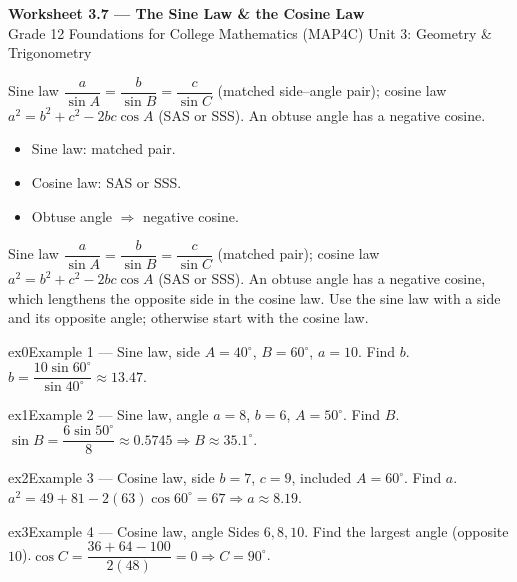 \documentclass[11pt]{article}
\begin{document}
\begin{center}
{\LARGE\bfseries\color{titleblue}Worksheet 3.7 --- The Sine Law \& the Cosine Law}\\[2pt]
{\small Grade 12 Foundations for College Mathematics (MAP4C) \textperiodcentered{} Unit 3: Geometry \& Trigonometry}
\end{center}

\begin{ideabox}
Sine law $\dfrac{a}{\sin A}=\dfrac{b}{\sin B}=\dfrac{c}{\sin C}$ (matched side–angle pair); cosine law $a^2=b^2+c^2-2bc\cos A$ (SAS or SSS). An obtuse angle has a negative cosine.
\begin{itemize}[leftmargin=*,itemsep=2pt]
  \item Sine law: matched pair.
  \item Cosine law: SAS or SSS.
  \item Obtuse angle $\Rightarrow$ negative cosine.
\end{itemize}
\end{ideabox}

\begin{learnbox}
Sine law $\dfrac{a}{\sin A}=\dfrac{b}{\sin B}=\dfrac{c}{\sin C}$ (matched pair); cosine law $a^2=b^2+c^2-2bc\cos A$ (SAS or SSS).
An obtuse angle has a negative cosine, which lengthens the opposite side in the cosine law.
Use the sine law with a side and its opposite angle; otherwise start with the cosine law.
\end{learnbox}


\begin{example}{ex0}{Example 1 --- Sine law, side}
$A=40^\circ$, $B=60^\circ$, $a=10$. Find $b$.\soln $b=\dfrac{10\sin60^\circ}{\sin40^\circ}\approx13.47$.
\end{example}

\begin{example}{ex1}{Example 2 --- Sine law, angle}
$a=8$, $b=6$, $A=50^\circ$. Find $B$.\soln $\sin B=\dfrac{6\sin50^\circ}{8}\approx0.5745\Rightarrow B\approx35.1^\circ$.
\end{example}

\begin{example}{ex2}{Example 3 --- Cosine law, side}
$b=7$, $c=9$, included $A=60^\circ$. Find $a$.\soln $a^2=49+81-2(63)\cos60^\circ=67\Rightarrow a\approx8.19$.
\end{example}

\begin{example}{ex3}{Example 4 --- Cosine law, angle}
Sides $6,8,10$. Find the largest angle (opposite $10$).\soln $\cos C=\dfrac{36+64-100}{2(48)}=0\Rightarrow C=90^\circ$.
\end{example}
\end{document}
